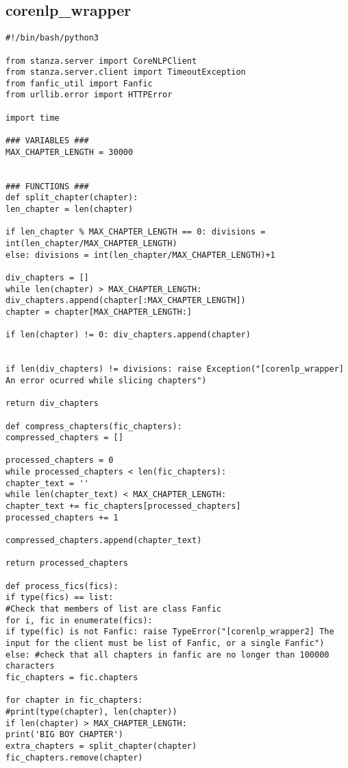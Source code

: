 \documentclass{pre-tfg}
\begin{document}
\subsection{corenlp\_wrapper}
\begin{lstlisting}[style=consola]
#!/bin/bash/python3

from stanza.server import CoreNLPClient
from stanza.server.client import TimeoutException
from fanfic_util import Fanfic
from urllib.error import HTTPError

import time

### VARIABLES ###
MAX_CHAPTER_LENGTH = 30000


### FUNCTIONS ###
def split_chapter(chapter):
len_chapter = len(chapter)

if len_chapter % MAX_CHAPTER_LENGTH == 0: divisions = int(len_chapter/MAX_CHAPTER_LENGTH)
else: divisions = int(len_chapter/MAX_CHAPTER_LENGTH)+1

div_chapters = []
while len(chapter) > MAX_CHAPTER_LENGTH:
div_chapters.append(chapter[:MAX_CHAPTER_LENGTH])
chapter = chapter[MAX_CHAPTER_LENGTH:]

if len(chapter) != 0: div_chapters.append(chapter)


if len(div_chapters) != divisions: raise Exception("[corenlp_wrapper] An error ocurred while slicing chapters")

return div_chapters

def compress_chapters(fic_chapters):
compressed_chapters = []

processed_chapters = 0
while processed_chapters < len(fic_chapters):
chapter_text = ''
while len(chapter_text) < MAX_CHAPTER_LENGTH:
chapter_text += fic_chapters[processed_chapters]
processed_chapters += 1

compressed_chapters.append(chapter_text)

return processed_chapters

def process_fics(fics):
if type(fics) == list:
#Check that members of list are class Fanfic
for i, fic in enumerate(fics):
if type(fic) is not Fanfic: raise TypeError("[corenlp_wrapper2] The input for the client must be list of Fanfic, or a single Fanfic")
else: #check that all chapters in fanfic are no longer than 100000 characters
fic_chapters = fic.chapters

for chapter in fic_chapters:
#print(type(chapter), len(chapter))
if len(chapter) > MAX_CHAPTER_LENGTH:
print('BIG BOY CHAPTER')
extra_chapters = split_chapter(chapter)
fic_chapters.remove(chapter)


\end{lstlisting}
\end{document}
